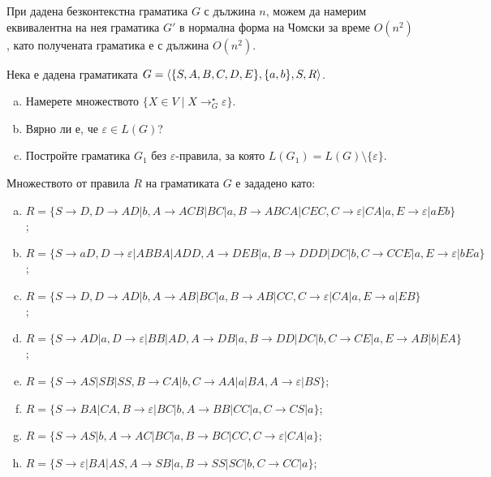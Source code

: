 \begin{thm}
  При дадена безконтекстна граматика $G$ с дължина $n$, можем да намерим еквивалентна
  на нея граматика $G'$ в нормална форма на Чомски за време $O(n^2)$,
  като получената граматика е с дължина $O(n^2)$.
\end{thm}


\begin{problem}
  Нека е дадена граматиката  $G = \langle{\{S,A,B,C,D,E\}, \{a,b\},S, R}\rangle$.
  \begin{enumerate}[a)]
  \item
    Намерете множеството $\{X \in V \mid X \rightarrow^\star_G \varepsilon\}$.
  \item
    Вярно ли е, че $\varepsilon \in L(G)$?
  \item
    Постройте граматика $G_1$ без $\varepsilon$-правила, за която $L(G_1)=L(G)\setminus\{\varepsilon\}$.
  \end{enumerate}
  Множеството от правила $R$ на граматиката $G$ е зададено като:
  \begin{enumerate}[a)]
  \item
    $R = \{S\rightarrow D,D\rightarrow AD|b,A\rightarrow ACB|BC|a, B\rightarrow ABCA|CEC,C\rightarrow \varepsilon|CA|a, E\rightarrow \varepsilon|aEb\}$;
  \item
    $R = \{S \rightarrow aD, D\rightarrow \varepsilon|ABBA|ADD,A\rightarrow DEB|a,B\rightarrow DDD|DC|b,C\rightarrow CCE|a, E\rightarrow \varepsilon|bEa\}$;
  \item
    $R = \{ S\rightarrow D,D\rightarrow AD|b,A\rightarrow AB|BC|a, B\rightarrow AB|CC, C\rightarrow \varepsilon|CA|a, E\rightarrow a|EB\}$;
  \item
    $R = \{ S \rightarrow AD|a, D\rightarrow \varepsilon|BB|AD,A\rightarrow DB|a,B\rightarrow DD|DC|b,C\rightarrow CE|a, E\rightarrow AB|b|EA\}$;
  \item
    $R =\{S\rightarrow AS|SB|SS,B\rightarrow CA|b, C\rightarrow AA|a|BA,A\rightarrow \varepsilon|BS\}$;
  \item
    $R = \{S\rightarrow BA|CA,B\rightarrow \varepsilon |BC|b,A\rightarrow BB|CC|a, C\rightarrow CS|a\}$;
  \item
    $R = \{S\rightarrow AS|b,A\rightarrow AC|BC|a, B\rightarrow BC|CC,C\rightarrow \varepsilon|CA|a\}$;
  \item
    $R = \{S\rightarrow \varepsilon|BA|AS,A\rightarrow SB|a,B\rightarrow SS|SC|b,
    C\rightarrow CC|a\}$; 
  \end{enumerate}
\end{problem}

